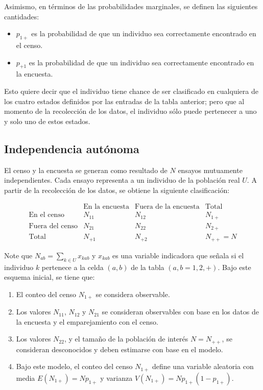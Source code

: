 \documentclass[
  12pt,
]{book}
\providecommand{\tightlist}{%
  \setlength{\itemsep}{0pt}\setlength{\parskip}{0pt}}
\begin{document}
Asimismo, en términos de las probabilidades marginales, se definen las siguientes cantidades:

\begin{itemize}
\tightlist
\item
  \(p_{1+}\) es la probabilidad de que un individuo sea correctamente encontrado en el censo.
\item
  \(p_{+1}\) es la probabilidad de que un individuo sea correctamente encontrado en la encuesta.
\end{itemize}

Esto quiere decir que el individuo tiene chance de ser clasificado en cualquiera de los cuatro estados definidos por las entradas de la tabla anterior; pero que al momento de la recolección de los datos, el individuo sólo puede pertenecer a uno y solo uno de estos estados.

\hypertarget{independencia-autuxf3noma}{%
\subsection{Independencia autónoma}\label{independencia-autuxf3noma}}

El censo y la encuesta se generan como resultado de \(N\) ensayos mutuamente independientes. Cada ensayo representa a un individuo de la población real \(U\). A partir de la recolección de los datos, se obtiene la siguiente clasificación:

\[
    \begin{array}{c|cc|c}
    & \text{En la encuesta} & \text{Fuera de la encuesta} & \text{Total} \\
    \hline
    \text{En el censo} & N_{11} & N_{12} & N_{1+} \\
    \text{Fuera del censo} & N_{21} & N_{22} & N_{2+} \\
    \hline
    \text{Total} & N_{+1} & N_{+2} & N_{++} = N
    \end{array}
    \]

Note que \(N_{ab} = \sum_{k \in U} x_{kab}\) y \(x_{kab}\) es una variable indicadora que señala si el individuo \(k\) pertenece a la celda \((a, b)\) de la tabla \((a, b = 1,2,+)\). Bajo este esquema inicial, se tiene que:

\begin{enumerate}
\def\labelenumi{\arabic{enumi}.}
\tightlist
\item
  El conteo del censo \(N_{1+}\) se considera observable.
\item
  Los valores \(N_{11}\), \(N_{12}\) y \(N_{21}\) se consideran observables con base en los datos de la encuesta y el emparejamiento con el censo.
\item
  Los valores \(N_{22}\), y el tamaño de la población de interés \(N = N_{++}\), se consideran desconocidos y deben estimarse con base en el modelo.
\item
  Bajo este modelo, el conteo del censo \(N_{1+}\) define una variable aleatoria con media \(E(N_{1+}) = Np_{1+}\) y varianza \(V(N_{1+}) = Np_{1+}(1 - p_{1+})\).
\end{enumerate}
\end{document}
